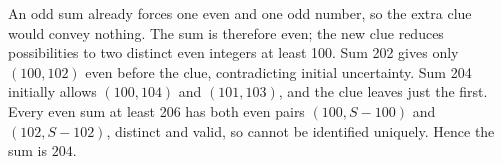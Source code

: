 An odd sum already forces one even and one odd number, so the extra clue would convey nothing. The sum is therefore even; the new clue reduces possibilities to two distinct even integers at least 100. Sum 202 gives only $(100,102)$ even before the clue, contradicting initial uncertainty. Sum 204 initially allows $(100,104)$ and $(101,103)$, and the clue leaves just the first. Every even sum at least 206 has both even pairs $(100,S-100)$ and $(102,S-102)$, distinct and valid, so cannot be identified uniquely. Hence the sum is $\boxed{204}$.
